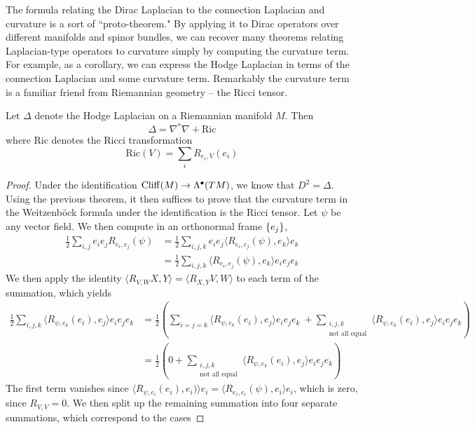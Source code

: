%
The formula relating the Dirac Laplacian to the connection Laplacian and curvature
is a sort of ``proto-theorem." By applying it to Dirac operators over different
manifolds and spinor bundles, we can recover many theorems relating Laplacian-type
operators to curvature simply by computing the curvature term. For example,
as a corollary, we can express the Hodge Laplacian in terms of the connection Laplacian
and some curvature term. Remarkably the curvature term is a familiar friend from
Riemannian geometry -- the Ricci tensor.
%
\begin{cor}
Let $\Delta$ denote the Hodge Laplacian on a Riemannian manifold $M$. Then
\[
\Delta = \nabla^*\nabla + \mathrm{Ric}
\]
where $\mathrm{Ric}$ denotes the Ricci transformation
\[
\mathrm{Ric}(V) = \sum_{i} R_{e_i,V}(e_i)
\]
\end{cor}
%
\begin{proof}
Under the identification $\operatorname{Cliff}(M) \to \Lambda^\bullet(TM)$, we know that
$D^2 = \Delta$. Using the previous theorem, it then suffices to prove that the curvature
term in the Weitzenb\"ock formula under the identification is the Ricci tensor.
Let $\psi$ be any vector field. We then compute in an orthonormal frame $\left\lbrace e_j \right\rbrace$,
\begin{align*}
\frac{1}{2}\sum_{i,j}e_ie_jR_{e_i,e_j}(\psi)
&= \frac{1}{2}\sum_{i,j,k}e_ie_j\langle R_{e_i,e_j}(\psi), e_k\rangle e_k \\
&= \frac{1}{2}\sum_{i,j,k}\langle R_{e_i,e_j}(\psi), e_k\rangle e_ie_je_k
\end{align*}
We then apply the identity $\langle R_{V,W}X,Y\rangle = \langle R_{X,Y}V, W \rangle$
to each term of the summation, which yields
\begin{align*}
\frac{1}{2}\sum_{i,j,k} \langle R_{\psi,e_k}(e_i), e_j\rangle e_ie_je_k
&= \frac{1}{2}\left( \sum_{i = j = k} \langle R_{\psi,e_k}(e_i), e_j\rangle e_ie_je_k
~+ \sum_{\substack{i,j,k \\ \text{not all equal}}}
\langle R_{\psi,e_k}(e_i), e_j\rangle e_ie_je_k \right) \\[5pt]
&= \frac{1}{2}\left( 0 + \sum_{\substack{i,j,k \\ \text{not all equal}}}
\langle R_{\psi,e_k}(e_i), e_j\rangle e_ie_je_k \right)
\end{align*}
The first term vanishes since
$\langle R_{\psi,e_i}(e_i), e_i) \rangle e_i =\langle R_{e_i,e_i}(\psi),e_i\rangle e_i$,
which is zero, since $R_{V,V} = 0$. We then split up the remaining summation into four
separate summations, which correspond to the cases

\end{proof}

